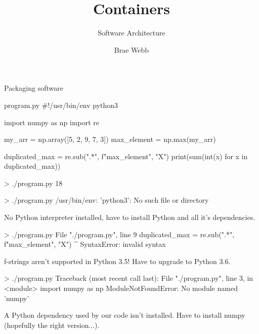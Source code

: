 \documentclass{slide}
\title{Containers}
\subtitle{Software Architecture}
\author{Brae Webb}
\date{\week{3}}
\begin{document}
\maketitle



\begin{frame}[fragile]{Packaging software}
    \vspace{-1em}
    \begin{code}[language=python]{program.py}
#!/usr/bin/env python3

import numpy as np
import re

my_arr = np.array([5, 2, 9, 7, 3])
max_element = np.max(my_arr)

duplicated_max = re.sub(".*", f"{max_element}", "X")
print(sum(int(x) for x in duplicated_max))
    \end{code}
    \begin{code}[numbers=none]{}
> ./program.py
18
    \end{code}
\end{frame}


\begin{frame}[fragile]
    \begin{code}[numbers=none]{}
> ./program.py
/usr/bin/env: 'python3': No such file or directory
    \end{code}
    \pause
    No Python interpreter installed,
    have to install Python and all it's dependencies.
\end{frame}

\begin{frame}[fragile]
    \begin{code}[numbers=none]{}
> ./program.py
File "./program.py", line 9
    duplicated_max = re.sub(".*", f"{max_element}", "X")
                                                 ^
SyntaxError: invalid syntax
    \end{code}
    \pause
    f-strings aren't supported in Python 3.5!
    Have to upgrade to Python 3.6.
\end{frame}

\begin{frame}[fragile]
    \begin{code}[numbers=none]{}
> ./program.py
Traceback (most recent call last):
  File "./program.py", line 3, in <module>
    import numpy as np
ModuleNotFoundError: No module named 'numpy'
    \end{code}
    \pause
    A Python dependency used by our code isn't installed.
    Have to install numpy (hopefully the right version...).
\end{frame}
\end{document}
